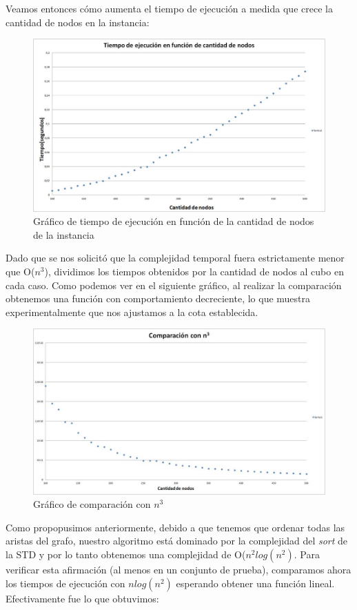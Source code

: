 \documentclass[11pt, a4paper, twoside]{article}
\begin{document}
Veamos entonces cómo aumenta el tiempo de ejecución a medida que crece la cantidad de nodos en la instancia: 

\begin{figure}[H]
\centering
\includegraphics[scale=0.5]{imagenes/graph3.jpg}
\caption{Gráfico de tiempo de ejecución en función de la cantidad de nodos de la instancia}
\end{figure}

Dado que se nos solicitó que la complejidad temporal fuera estrictamente menor que O($n^3$), dividimos los tiempos obtenidos por la cantidad de nodos al cubo en cada caso. Como podemos ver en el siguiente gráfico, al realizar la comparación obtenemos una función con comportamiento decreciente, lo que muestra experimentalmente que nos ajustamos a la cota establecida.

\begin{figure}[H]
\centering
\includegraphics[scale=0.5]{imagenes/graph4.jpg}
\caption{Gráfico de comparación con $n^3$}
\end{figure}

Como propopusimos anteriormente, debido a que tenemos que ordenar todas las aristas del grafo, nuestro algoritmo está dominado por la complejidad del \textit{sort} de la STD y por lo tanto obtenemos una complejidad de O($n^2log(n^2)$. Para verificar esta afirmación (al menos en un conjunto de prueba), comparamos ahora los tiempos de ejecución con $nlog(n^2)$ esperando obtener una función lineal. Efectivamente fue lo que obtuvimos:
\end{document}
